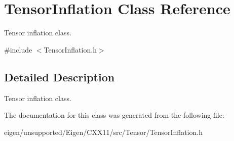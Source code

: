 \hypertarget{class_tensor_inflation}{}\section{Tensor\+Inflation Class Reference}
\label{class_tensor_inflation}


Tensor inflation class.  




{\ttfamily \#include $<$Tensor\+Inflation.\+h$>$}



\subsection{Detailed Description}
Tensor inflation class. 

The documentation for this class was generated from the following file\+:\begin{DoxyCompactItemize}
\item 
eigen/unsupported/\+Eigen/\+C\+X\+X11/src/\+Tensor/\+Tensor\+Inflation.\+h\end{DoxyCompactItemize}
